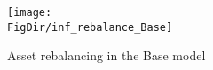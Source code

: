 \hypertarget{inf_rebalance_Base}{}
\begin{figure}[tbp]
\centerline{\texttt{[image: \\FigDir/inf\_rebalance\_Base]}}
\caption{Asset rebalancing in the Base model}
\label{fig:inf_rebalance_Base}
\end{figure}
